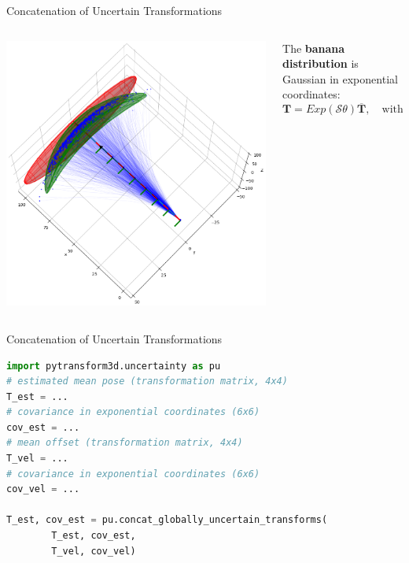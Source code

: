 \documentclass[14pt,aspectratio=169]{beamer}
\begin{document}
\begin{frame}[fragile]{Concatenation of Uncertain Transformations}
\begin{columns}
\begin{column}{0.3\textwidth}
\includegraphics[width=\textwidth]{images/state_estimation_4}
\end{column}
\begin{column}{0.65\textwidth}
The \textbf{banana distribution} is Gaussian in exponential coordinates:
\[
\boldsymbol{T} = Exp(\mathcal{S}\theta) \overline{\boldsymbol{T}},\quad \textrm{with} \quad \mathcal{S}\theta \sim \mathcal{N}\left(\boldsymbol{0}, \boldsymbol{\Sigma}_{6 \times 6}\right)
\]
\parencite{Long2012,Barfoot2014}
\end{column}
\end{columns}
\end{frame}

\begin{frame}[fragile]{Concatenation of Uncertain Transformations}
\begin{lstlisting}[language=Python]
import pytransform3d.uncertainty as pu
# estimated mean pose (transformation matrix, 4x4)
T_est = ...
# covariance in exponential coordinates (6x6)
cov_est = ...
# mean offset (transformation matrix, 4x4)
T_vel = ...
# covariance in exponential coordinates (6x6)
cov_vel = ...

T_est, cov_est = pu.concat_globally_uncertain_transforms(
        T_est, cov_est,
        T_vel, cov_vel)
\end{lstlisting}
\end{frame}
\end{document}
